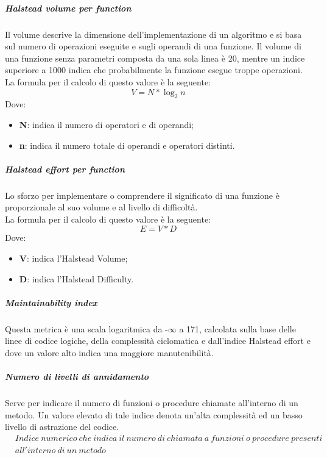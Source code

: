 \documentclass[../NormeDiProgetto_v4.0.0.tex]{subfiles}
\begin{document}
			\subparagraph{Halstead volume per function}
			Il volume descrive la dimensione dell'implementazione di un algoritmo e si basa sul numero di operazioni eseguite e sugli operandi di una funzione. Il volume di una funzione senza parametri composta da una sola linea è 20, mentre un indice superiore a 1000 indica che probabilmente la funzione esegue troppe operazioni.
				\\La formula per il calcolo di questo valore è la seguente:
				\begin{equation*}
					V = N * \log_{2}{n}
				\end{equation*}
				Dove:
				\begin{itemize}
					\item \textbf{N}: indica il numero di operatori e di operandi;
					\item \textbf{n}: indica il numero totale di operandi e operatori distinti.
				\end{itemize}

			\subparagraph{Halstead effort per function}
				Lo sforzo per implementare o comprendere il significato di una funzione è proporzionale al suo volume e al livello di difficoltà.
				\\La formula per il calcolo di questo valore è la seguente:
				\begin{equation*}
					E = V * D
				\end{equation*}
				Dove:
				\begin{itemize}
					\item \textbf{V}: indica l'Halstead Volume;
					\item \textbf{D}: indica l'Halstead Difficulty.
				\end{itemize}
				
			\subparagraph{Maintainability index}
			Questa metrica è una scala logaritmica da -$\infty$ a 171, calcolata sulla base delle linee di codice logiche, della complessità ciclomatica e dall'indice Halstead effort e dove un valore alto indica una maggiore manutenibilità.\\

			\subparagraph{Numero di livelli di annidamento}
				Serve per indicare il numero di funzioni o procedure chiamate all'interno di un metodo. Un valore elevato di tale indice denota un'alta complessità ed un basso livello di astrazione del codice.
				\begin{equation*}
					\begin{split}
						&Indice \ numerico \ che \ indica \ il \ numero \ di \ chiamata \ a \ funzioni \ o \ procedure \ presenti \\ 								&all'interno \ di \ un \ metodo
					\end{split}
				\end{equation*}
			
\end{document}
